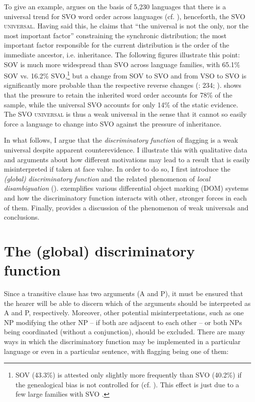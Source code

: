 \documentclass[output=paper]{langsci/langscibook}
\begin{document}
To give an example, \citet{Hammarström2015} argues on the basis of 5,230 languages that there is a universal trend for SVO word order across languages (cf. \citealt{Gell-MannRuhlen2011,MauritsGriffiths2014}), henceforth, the \textsc{SVO universal}. Having said this, he claims that “the universal is not the only, nor the most important factor” constraining the synchronic distribution; the most important factor responsible for the current distribution is the order of the immediate ancestor, i.e. inheritance. The following figures illustrate this point: SOV is much more widespread than SVO across language families, with 65.1\% SOV vs. 16.2\% SVO,\footnote{SOV (43.3\%) is attested only slightly more frequently than SVO (40.2\%) if the genealogical bias is not controlled for (cf. \citealt{Dryer2013}). This effect is just due to a few large families with SVO \citep{Hammarström2015}.} but a change from SOV to SVO and from VSO to SVO is significantly more probable than the respective reverse changes (\citealt{Croft2003}: 234; \citealt{MauritsGriffiths2014}). \citet{Hammarström2015} shows that the pressure to retain the inherited word order accounts for 78\% of the sample, while the universal SVO accounts for only 14\% of the static evidence. The SVO \textsc{universal} is thus a weak universal in the sense that it cannot so easily force a language to change into SVO against the pressure of inheritance.

In what follows, I argue that the \textit{discriminatory} \textit{function} of flagging is a weak universal despite apparent counterevidence. I illustrate this with qualitative data and arguments about how different motivations may lead to a result that is easily misinterpreted if taken at face value. In order to do so, I first introduce the \textit{(global)} \textit{discriminatory} \textit{function} and the related phenomenon of \textit{local} \textit{disambiguation} ().  exemplifies various differential object marking (DOM) systems and how the discriminatory function interacts with other, stronger forces in each of them. Finally,  provides a discussion of the phenomenon of weak universals and conclusions.

\section{The (global) discriminatory function}\label{sec:serzant:2}

Since a transitive clause has two arguments (A and P), it must be ensured that the hearer will be able to discern which of the arguments should be interpreted as A and P, respectively. Moreover, other potential misinterpretations, such as one NP modifying the other NP – if both are adjacent to each other – or both NPs being coordinated (without a conjunction), should be excluded. There are many ways in which the discriminatory function may be implemented in a particular language or even in a particular sentence, with flagging being one of them: 
\end{document}
